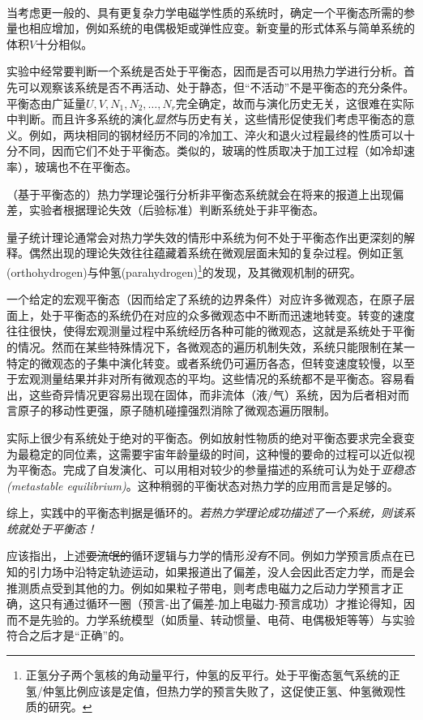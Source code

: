 \ 

当考虑更一般的、具有更复杂力学电磁学性质的系统时，确定一个平衡态所需的参量也相应增加，例如系统的电偶极矩或弹性应变。新变量的形式体系与简单系统的体积$V$十分相似。

实验中经常要判断一个系统是否处于平衡态，因而是否可以用热力学进行分析。首先可以观察该系统是否不再活动、处于静态，但“不活动”不是平衡态的充分条件。平衡态由广延量$U, V, N_1, N_2, \dots, N_r$完全确定，故而与演化历史无关，这很难在实际中判断。而且许多系统的演化{\it 显然}与历史有关，这些情形促使我们考虑平衡态的意义。例如，两块相同的钢材经历不同的冷加工、淬火和退火过程最终的性质可以十分不同，因而它们不处于平衡态。类似的，玻璃的性质取决于加工过程（如冷却速率），玻璃也不在平衡态。

（基于平衡态的）热力学理论强行分析非平衡态系统就会在将来的报道上出现偏差，实验者根据理论失效（后验标准）判断系统处于非平衡态。

量子统计理论通常会对热力学失效的情形中系统为何不处于平衡态作出更深刻的解释。偶然出现的理论失效往往蕴藏着系统在微观层面未知的复杂过程。例如正氢(orthohydrogen)与仲氢(parahydrogen)\footnote{正氢分子两个氢核的角动量平行，仲氢的反平行。处于平衡态氢气系统的正氢/仲氢比例应该是定值，但热力学的预言失败了，这促使正氢、仲氢微观性质的研究。}的发现，及其微观机制的研究。

一个给定的宏观平衡态（因而给定了系统的边界条件）对应许多微观态，在原子层面上，处于平衡态的系统仍在对应的众多微观态中不断而迅速地转变。转变的速度往往很快，使得宏观测量过程中系统经历各种可能的微观态，这就是系统处于平衡的情况。然而在某些特殊情况下，各微观态的遍历机制失效，系统只能限制在某一特定的微观态的子集中演化转变。或者系统仍可遍历各态，但转变速度较慢，以至于宏观测量结果并非对所有微观态的平均。这些情况的系统都不是平衡态。容易看出，这些奇异情况更容易出现在固体，而非流体（液/气）系统，因为后者相对而言原子的移动性更强，原子随机碰撞强烈消除了微观态遍历限制。

实际上很少有系统处于绝对的平衡态。例如放射性物质的绝对平衡态要求完全衰变为最稳定的同位素，这需要宇宙年龄量级的时间，这种慢的要命的过程可以近似视为平衡态。完成了自发演化、可以用相对较少的参量描述的系统可认为处于{\it 亚稳态 (metastable equilibrium)}。这种稍弱的平衡状态对热力学的应用而言是足够的。

综上，实践中的平衡态判据是循环的。{\it 若热力学理论成功描述了一个系统，则该系统就处于平衡态！}

应该指出，上述\sout{耍流氓的}循环逻辑与力学的情形{\it 没有}不同。例如力学预言质点在已知的引力场中沿特定轨迹运动，如果报道出了偏差，没人会因此否定力学，而是会推测质点受到其他的力。例如如果粒子带电，则考虑电磁力之后动力学预言才正确，这只有通过循环一圈（预言-出了偏差-加上电磁力-预言成功）才推论得知，因而不是先验的。力学系统模型（如质量、转动惯量、电荷、电偶极矩等等）与实验符合之后才是“正确”的。

